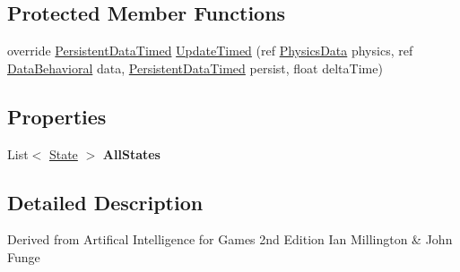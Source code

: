 \subsection*{Protected Member Functions}
\begin{DoxyCompactItemize}
\item 
override \hyperlink{class_skyrates_1_1_a_i_1_1_behavior_timed_1_1_persistent_data_timed}{Persistent\-Data\-Timed} \hyperlink{class_skyrates_1_1_a_i_1_1_state_1_1_state_machine_aaf0c030821a596d0bdeee0b87c96bd6e}{Update\-Timed} (ref \hyperlink{class_skyrates_1_1_physics_1_1_physics_data}{Physics\-Data} physics, ref \hyperlink{class_skyrates_1_1_a_i_1_1_behavior_1_1_data_behavioral}{Data\-Behavioral} data, \hyperlink{class_skyrates_1_1_a_i_1_1_behavior_timed_1_1_persistent_data_timed}{Persistent\-Data\-Timed} persist, float delta\-Time)
\end{DoxyCompactItemize}
\subsection*{Properties}
\begin{DoxyCompactItemize}
\item 
\hypertarget{class_skyrates_1_1_a_i_1_1_state_1_1_state_machine_a7faffae06917c566f97b2365e6a8bd1a}{List$<$ \hyperlink{class_skyrates_1_1_a_i_1_1_state_1_1_state}{State} $>$ {\bfseries All\-States}}\label{class_skyrates_1_1_a_i_1_1_state_1_1_state_machine_a7faffae06917c566f97b2365e6a8bd1a}

\end{DoxyCompactItemize}


\subsection{Detailed Description}


Derived from Artifical Intelligence for Games 2nd Edition Ian Millington \& John Funge 

